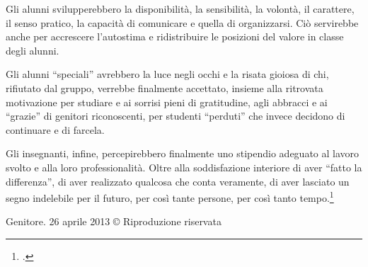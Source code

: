 Gli alunni svilupperebbero la disponibilità, la sensibilità, la volontà, il carattere, il senso pratico, la capacità di comunicare e quella di organizzarsi. Ciò servirebbe anche per accrescere l'autostima e ridistribuire le posizioni del valore in classe degli alunni.

Gli alunni “speciali” avrebbero la luce negli occhi e la risata gioiosa di chi, rifiutato dal gruppo, verrebbe finalmente accettato, insieme alla ritrovata motivazione per studiare e ai sorrisi pieni di gratitudine, agli abbracci e ai “grazie” di genitori riconoscenti, per studenti “perduti” che invece decidono di continuare e di farcela.

Gli insegnanti, infine, percepirebbero finalmente uno stipendio adeguato al lavoro svolto e alla loro professionalità. Oltre alla soddisfazione interiore di aver “fatto la differenza”, di aver realizzato qualcosa che conta veramente, di aver lasciato un segno indelebile per il futuro, per così tante persone, per così tanto tempo.\footcite{Felaco2013}


Genitore.
26 aprile 2013
© Riproduzione riservata
 
 
